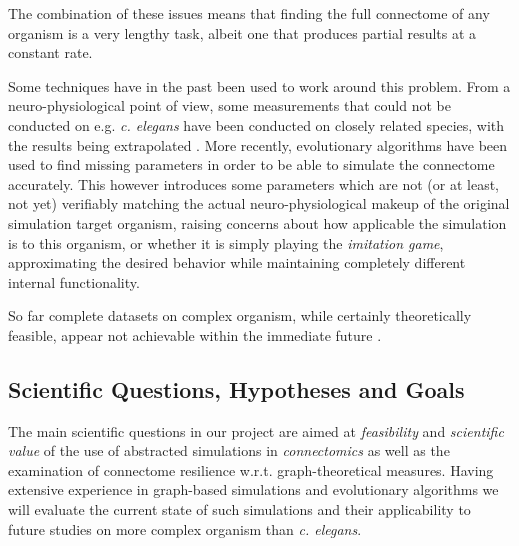 \documentclass[a4paper,11pt]{article}
\begin{document}
The combination of these issues means that finding the full connectome of any organism is a very lengthy task, albeit one that produces partial results at a constant rate. 

Some techniques have in the past been used to work around this problem. From a neuro-physiological point of view, some measurements that could not be conducted on e.g. \emph{c. elegans} have been conducted on closely related species, with the results being extrapolated \citep{ThatBlueBook}. More recently, evolutionary algorithms have been used to find missing parameters in order to be able to simulate the connectome accurately. This however introduces some parameters which are not (or at least, not yet) verifiably matching the actual neuro-physiological makeup of the original simulation target organism, raising concerns about how applicable the simulation is to this organism, or whether it is simply playing the \emph{imitation game}, approximating the desired behavior while maintaining completely different internal functionality.

So far complete datasets on complex organism, while certainly theoretically feasible, appear not achievable within the immediate future \citep{Gjorgjieva2014} \citep{Mikula2016}.


\subsection{Scientific Questions, Hypotheses and Goals}

The main scientific questions in our project are aimed at \emph{feasibility} and \emph{scientific value} of the use of abstracted simulations in \emph {connectomics} as well as the examination of connectome resilience w.r.t. graph-theoretical measures. Having extensive experience in graph-based simulations and evolutionary algorithms we will evaluate the current state of such simulations and their applicability to future studies on more complex organism than \emph{c. elegans}.
\end{document}
